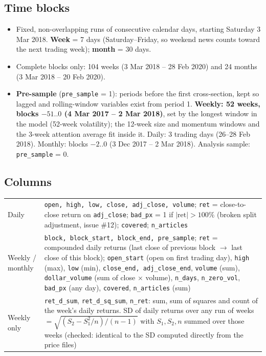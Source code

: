 \documentclass[11pt]{article}
\newcommand{\var}[1]{\texttt{#1}}
\begin{document}
\subsection{Time blocks}\label{sec:blocks}
\begin{itemize}
  \item Fixed, non-overlapping runs of consecutive calendar days, starting Saturday 3 Mar 2018. \textbf{Week} = 7 days (Saturday--Friday, so weekend news counts toward the next trading week); \textbf{month} = 30 days.
  \item Complete blocks only: 104 weeks (3 Mar 2018 -- 28 Feb 2020) and 24 months (3 Mar 2018 -- 20 Feb 2020).
  \item \textbf{Pre-sample} (\var{pre\_sample} = 1): periods before the first cross-section, kept so lagged and rolling-window variables exist from period 1. \textbf{Weekly: 52 weeks, blocks $-51..0$ (4 Mar 2017 -- 2 Mar 2018)}, set by the longest window in the model (52-week volatility); the 12-week size and momentum windows and the 3-week attention average fit inside it. Daily: 3 trading days (26--28 Feb 2018). Monthly: blocks $-2..0$ (3 Dec 2017 -- 2 Mar 2018). Analysis sample: \var{pre\_sample} = 0.
\end{itemize}

\subsection{Columns}
\begin{center}\small
\begin{tabularx}{\textwidth}{@{}l L@{}}
\toprule
Daily & \var{open, high, low, close, adj\_close, volume}; \var{ret} = close-to-close return on \var{adj\_close}; \var{bad\_px} = 1 if $|\text{ret}| > 100\%$ (broken split adjustment, issue \#12); \var{covered}; \var{n\_articles}\\
Weekly / monthly & \var{block, block\_start, block\_end, pre\_sample}; \var{ret} = compounded daily returns (last close of previous block $\rightarrow$ last close of this block); \var{open\_start} (open on first trading day), \var{high} (max), \var{low} (min), \var{close\_end, adj\_close\_end}, \var{volume} (sum), \var{dollar\_volume} (sum of close $\times$ volume), \var{n\_days}, \var{n\_zero\_vol}, \var{bad\_px} (any day), \var{covered}, \var{n\_articles} (sum)\\
Weekly only & \var{ret\_d\_sum}, \var{ret\_d\_sq\_sum}, \var{n\_ret}: sum, sum of squares and count of the week's daily returns. SD of daily returns over any run of weeks $= \sqrt{(S_2 - S_1^2/n)/(n-1)}$ with $S_1, S_2, n$ summed over those weeks (checked: identical to the SD computed directly from the price files)\\
\bottomrule
\end{tabularx}
\end{center}
\end{document}

